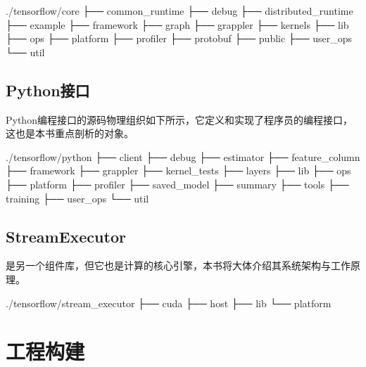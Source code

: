 \begin{content}
\begin{leftbar}
\begin{c++}[caption={内核源码结构}]
./tensorflow/core
├── common_runtime
├── debug
├── distributed_runtime
├── example
├── framework
├── graph
├── grappler
├── kernels
├── lib
├── ops
├── platform
├── profiler
├── protobuf
├── public
├── user_ops
└── util
\end{c++}
\end{leftbar}

\subsection{Python接口}

Python编程接口的源码物理组织如下所示，它定义和实现了程序员的编程接口，这也是本书重点剖析的对象。

\begin{leftbar}
\begin{c++}[caption={Python源码结构}]
./tensorflow/python
├── client
├── debug
├── estimator
├── feature_column
├── framework
├── grappler
├── kernel_tests
├── layers
├── lib
├── ops
├── platform
├── profiler
├── saved_model
├── summary
├── tools
├── training
├── user_ops
└── util
\end{c++}
\end{leftbar}

\subsection{StreamExecutor}

是另一个组件库，但它也是计算的核心引擎，本书将大体介绍其系统架构与工作原理。

\begin{leftbar}
\begin{c++}[caption={StreamExecutor源码结构}]
./tensorflow/stream_executor
├── cuda
├── host
├── lib
└── platform
\end{c++}
\end{leftbar}

\end{content}

\section{工程构建}


